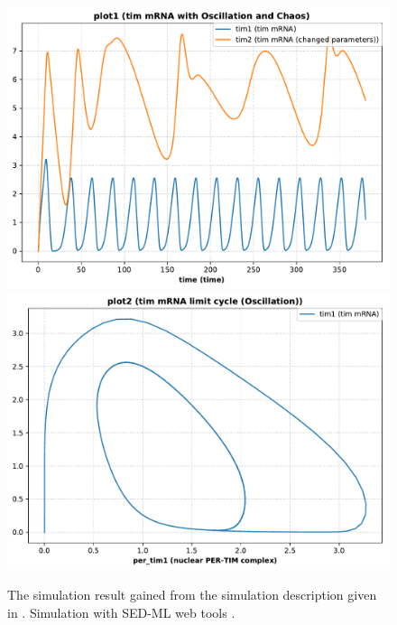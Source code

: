 \begin{figure}[ht]
\begin{minipage}{0.47\textwidth}
        \caption{The simulation result gained from the simulation description given in . Simulation with SED-ML web tools \citep{bergmann2017sed}.}
        \label{fig:leloup-sbml1}
    \end{minipage}\hfill
    \begin{minipage}{0.47\textwidth}
        \centering
         \includegraphics[width=1.0\textwidth]{examples/leloup-sbml/results/tellurium/plot1}
		\includegraphics[width=1.0\textwidth]{examples/leloup-sbml/results/tellurium/plot2}

\end{minipage}
\end{figure}
